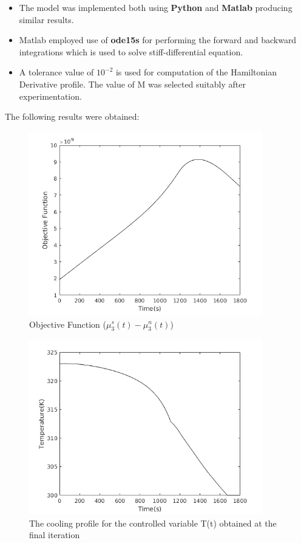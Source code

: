 \begin{itemize}
\item The model was implemented both using \textbf{Python} and \textbf{Matlab} producing similar results. 
\item Matlab employed use of \textbf{ode15s} for performing the forward and backward integrations which is used to solve stiff-differential equation. 
\item A tolerance value of $10^{-2}$ is used for computation of the Hamiltonian Derivative profile. The value of M was selected suitably after experimentation. 
\end{itemize}
The following results were obtained: \\
\begin{figure}[h!] 
\begin{center}
\includegraphics[width=4in]{Dobj.png}
\end{center}
\caption{Objective Function ($\mu_{3}^{s}(t) - \mu_{3}^{n}(t)$)}
\end{figure}
\begin{figure}[h!] 

\begin{center}
\includegraphics[width=4in]{Dtemp.png}
\end{center}
\caption{The cooling profile for the controlled variable T(t) obtained at the final iteration}
\end{figure}

